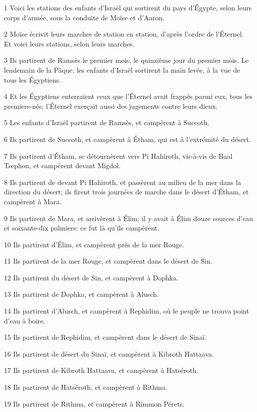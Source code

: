 \par 1 Voici les stations des enfants d'Israël qui sortirent du pays d'Égypte, selon leurs corps d'armée, sous la conduite de Moïse et d'Aaron.
\par 2 Moïse écrivit leurs marches de station en station, d'après l'ordre de l'Éternel. Et voici leurs stations, selon leurs marches.
\par 3 Ils partirent de Ramsès le premier mois, le quinzième jour du premier mois. Le lendemain de la Pâque, les enfants d'Israël sortirent la main levée, à la vue de tous les Égyptiens.
\par 4 Et les Égyptiens enterraient ceux que l'Éternel avait frappés parmi eux, tous les premiers-nés; l'Éternel exerçait aussi des jugements contre leurs dieux.
\par 5 Les enfants d'Israël partirent de Ramsès, et campèrent à Succoth.
\par 6 Ils partirent de Succoth, et campèrent à Étham, qui est à l'extrémité du désert.
\par 7 Ils partirent d'Étham, se détournèrent vers Pi Hahiroth, vis-à-vis de Baal Tsephon, et campèrent devant Migdol.
\par 8 Ils partirent de devant Pi Hahiroth, et passèrent au milieu de la mer dans la direction du désert; ils firent trois journées de marche dans le désert d'Étham, et campèrent à Mara.
\par 9 Ils partirent de Mara, et arrivèrent à Élim; il y avait à Élim douze sources d'eau et soixante-dix palmiers: ce fut là qu'ils campèrent.
\par 10 Ils partirent d'Élim, et campèrent près de la mer Rouge.
\par 11 Ils partirent de la mer Rouge, et campèrent dans le désert de Sin.
\par 12 Ils partirent du désert de Sin, et campèrent à Dophka.
\par 13 Ils partirent de Dophka, et campèrent à Alusch.
\par 14 Ils partirent d'Alusch, et campèrent à Rephidim, où le peuple ne trouva point d'eau à boire.
\par 15 Ils partirent de Rephidim, et campèrent dans le désert de Sinaï.
\par 16 Ils partirent de désert du Sinaï, et campèrent à Kibroth Hattaava.
\par 17 Ils partirent de Kibroth Hattaava, et campèrent à Hatséroth.
\par 18 Ils partirent de Hatséroth, et campèrent à Rithma.
\par 19 Ils partirent de Rithma, et campèrent à Rimmon Pérets.
